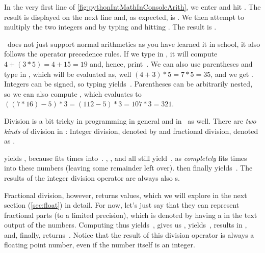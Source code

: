 In the very first line of \cref{fig:pythonIntMathInConsoleArith}, we enter \pythonIdx{+} and hit \keys{\enter}.
The result is displayed on the next line and, as expected, is .
We then attempt to multiply the two integers  and  by typing \pythonIdx{*} and hitting \keys{\enter}.
The result is .

\python\ does not just support normal arithmetics as you have learned it in school, it also follows the operator precedence rules.
If we type in , it will compute $4+(3*5)=4+15=19$\pythonIdx{(}\pythonIdx{)} and, hence, print~.
We can also use parentheses and type in , which will be evaluated as, well $(4+3)*5=7*5=35$, and we get .
Integers can be signed, so typing \pythonIdx{-} yields~.
Parentheses can be arbitrarily nested, so we can also compute , which evaluates to $((7 * 16) - 5) * 3 = (112-5)*3=107*3=321$\pythonIdx{(}\pythonIdx{)}.

Division is a bit tricky in programming in general and in \python\ as well.
There are \emph{two kinds} of division in \python: Integer division, denoted by \pythonilIdx{//} and fractional division, denoted as \pythonilIdx{/}.

 yields , because  fits  times into~.
, , and  all still yield~, as  \emph{completely} fits  times into these numbers (leaving some remainder left over).
 then finally yields~.
The results of the integer division operator \pythonilIdx{//} are always also s.

Fractional division, however, returns  values, which we will explore in the next section (\cref{sec:float}) in detail.
For now, let's just say that they can represent fractional parts (to a limited precision), which is denoted by having a  in the text output of the numbers.
Computing  thus yields~,  gives us ,  yields~,  results in , and, finally,  returns~.
Notice that the result of this division operator is always a floating point number, even if the number itself is an integer.

